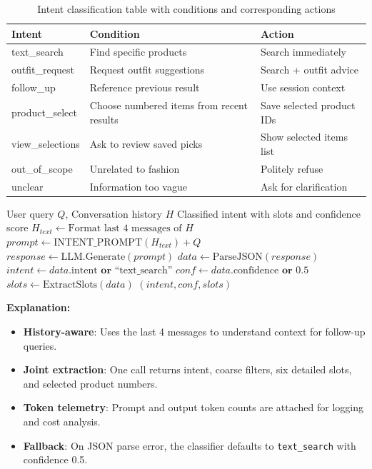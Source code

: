 \begin{table}[H]
\centering
\begin{tabular}{p{2.9cm}p{4.8cm}p{4.8cm}}
\toprule
\textbf{Intent} & \textbf{Condition} & \textbf{Action}\\
\midrule
text\_search    & Find specific products         & Search immediately\\
outfit\_request & Request outfit suggestions     & Search + outfit advice\\
follow\_up      & Reference previous result      & Use session context\\
product\_select & Choose numbered items from recent results & Save selected product IDs\\
view\_selections & Ask to review saved picks      & Show selected items list\\
out\_of\_scope  & Unrelated to fashion           & Politely refuse\\
unclear         & Information too vague          & Ask for clarification\\
\bottomrule
\end{tabular}
\caption{Intent classification table with conditions and corresponding actions}
\end{table}

\begin{algorithm}[H]
\caption{LLM-based Intent Classification}\label{alg:intent_class}
\begin{algorithmic}[1]
\Require User query $Q$, Conversation history $H$
\Ensure Classified intent with slots and confidence score
    \State $H_{text} \gets \text{Format last 4 messages of } H$
    \State $prompt \gets \text{INTENT\_PROMPT}(H_{text}) + Q$
    \State $response \gets \text{LLM.Generate}(prompt)$
    \State $data \gets \text{ParseJSON}(response)$
    \State $intent \gets data.\text{intent} \textbf{ or } \text{``text\_search''}$
    \State $conf \gets data.\text{confidence} \textbf{ or } 0.5$
    \State $slots \gets \text{ExtractSlots}(data)$
    \State \Return $(intent, conf, slots)$
\EndFunction
\end{algorithmic}
\end{algorithm}

\textbf{Explanation:}
\begin{itemize}
    \item \textbf{History-aware}: Uses the last 4 messages to understand context for follow-up queries.
    \item \textbf{Joint extraction}: One call returns intent, coarse filters, six detailed slots, and selected product numbers.
    \item \textbf{Token telemetry}: Prompt and output token counts are attached for logging and cost analysis.
    \item \textbf{Fallback}: On JSON parse error, the classifier defaults to \texttt{text\_search} with confidence 0.5.
\end{itemize}

